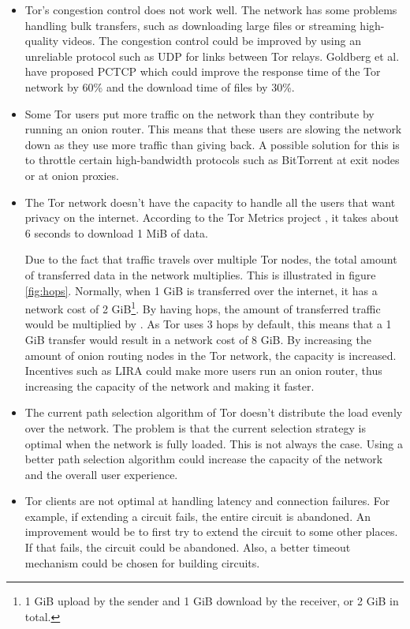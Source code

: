 \documentclass[12pt,journal,compsoc]{IEEEtran}
\begin{document}
		\begin{itemize}
			\item Tor's congestion control does not work well. The network has some problems handling bulk transfers, such as downloading large files or streaming high-quality videos. The congestion control could be improved by using an unreliable protocol such as UDP for links between Tor relays. Goldberg et al. \cite{alsabah2013pctcp} have proposed PCTCP which could improve the response time of the Tor network by 60\% and the download time of files by 30\%.	
		
			\item Some Tor users put more traffic on the network than they contribute by running an onion router. This means that these users are slowing the network down as they use more traffic than giving back. A possible solution for this is to throttle certain high-bandwidth protocols such as BitTorrent at exit nodes or at onion proxies.
		
			\item The Tor network doesn't have the capacity to handle all the users that want privacy on the internet. According to the Tor Metrics project \cite{tormetricsprojectwebsite}, it takes about 6 seconds to download 1 MiB of data.
			
			Due to the fact that traffic travels over multiple Tor nodes, the total amount of transferred data in the network multiplies. This is illustrated in figure \ref{fig:hops}. Normally, when 1 GiB is transferred over the internet, it has a network cost of 2 GiB\footnote{1 GiB upload by the sender and 1 GiB download by the receiver, or 2 GiB in total.}. By having  hops, the amount of transferred traffic would be multiplied by . As Tor uses 3 hops by default, this means that a 1 GiB transfer would result in a network cost of 8 GiB. By increasing the amount of onion routing nodes in the Tor network, the capacity is increased. Incentives such as LIRA \cite{jansen13lira} could make more users run an onion router, thus increasing the capacity of the network and making it faster.	
		
			\item The current path selection algorithm of Tor doesn't distribute the load evenly over the network. The problem is that the current selection strategy is optimal when the network is fully loaded. This is not always the case. Using a better path selection algorithm could increase the capacity of the network and the overall user experience.		
		
			\item Tor clients are not optimal at handling latency and connection failures. For example, if extending a circuit fails, the entire circuit is abandoned. An improvement would be to first try to extend the circuit to some other places. If that fails, the circuit could be abandoned. Also, a better timeout mechanism could be chosen for building circuits.
			

\end{itemize}
\end{document}
